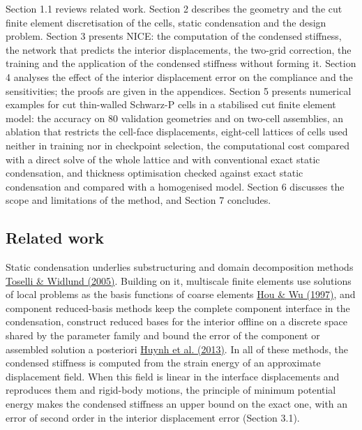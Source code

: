 \documentclass[preprint,12pt,authoryear]{elsarticle}
\begin{document}
Section 1.1 reviews related work. Section 2 describes the geometry and the cut finite element discretisation of the cells, static condensation and the design problem. Section 3 presents NICE: the computation of the condensed stiffness, the network that predicts the interior displacements, the two-grid correction, the training and the application of the condensed stiffness without forming it. Section 4 analyses the effect of the interior displacement error on the compliance and the sensitivities; the proofs are given in the appendices. Section 5 presents numerical examples for cut thin-walled Schwarz-P cells in a stabilised cut finite element model: the accuracy on 80 validation geometries and on two-cell assemblies, an ablation that restricts the cell-face displacements, eight-cell lattices of cells used neither in training nor in checkpoint selection, the computational cost compared with a direct solve of the whole lattice and with conventional exact static condensation, and thickness optimisation checked against exact static condensation and compared with a homogenised model. Section 6 discusses the scope and limitations of the method, and Section 7 concludes.

\subsection{Related work}

Static condensation underlies substructuring and domain decomposition methods \href{https://doi.org/10.1007/b137868}{Toselli \& Widlund (2005)}. Building on it, multiscale finite elements use solutions of local problems as the basis functions of coarse elements \href{https://doi.org/10.1006/jcph.1997.5682}{Hou \& Wu (1997)}, and component reduced-basis methods keep the complete component interface in the condensation, construct reduced bases for the interior offline on a discrete space shared by the parameter family and bound the error of the component or assembled solution a posteriori \href{https://doi.org/10.1051/m2an/2012022}{Huynh et al. (2013)}. In all of these methods, the condensed stiffness is computed from the strain energy of an approximate displacement field. When this field is linear in the interface displacements and reproduces them and rigid-body motions, the principle of minimum potential energy makes the condensed stiffness an upper bound on the exact one, with an error of second order in the interior displacement error (Section 3.1).
\end{document}
